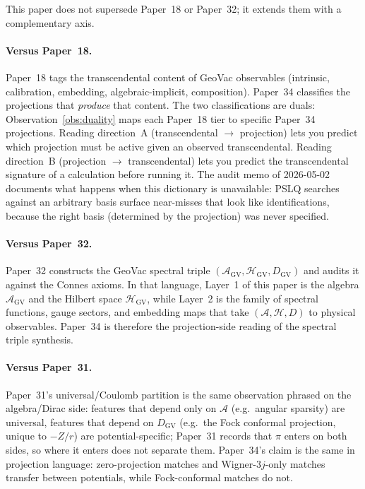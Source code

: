 \documentclass[11pt]{article}
\begin{document}
This paper does not supersede Paper~18 or Paper~32; it extends
them with a complementary axis.

\paragraph{Versus Paper~18.}  Paper~18 tags the transcendental
content of GeoVac observables (intrinsic, calibration, embedding,
algebraic-implicit, composition).  Paper~34 classifies the projections that
\emph{produce} that content.  The two classifications are
duals: Observation~\ref{obs:duality} maps each Paper~18 tier to
specific Paper~34 projections.  Reading direction~A
(transcendental $\to$ projection) lets you predict which projection
must be active given an observed transcendental.  Reading
direction~B (projection $\to$ transcendental) lets you predict the
transcendental signature of a calculation before running it.  The
audit memo of 2026-05-02 documents what happens when this dictionary
is unavailable: PSLQ searches against an arbitrary basis surface
near-misses that look like identifications, because the right basis
(determined by the projection) was never specified.

\paragraph{Versus Paper~32.}  Paper~32 constructs the GeoVac
spectral triple $(\mathcal{A}_{\text{GV}}, \mathcal{H}_{\text{GV}},
D_{\text{GV}})$ and audits it against the Connes axioms.  In that
language, Layer~1 of this paper is the algebra
$\mathcal{A}_{\text{GV}}$ and the Hilbert space
$\mathcal{H}_{\text{GV}}$, while Layer~2 is the family of
spectral functions, gauge sectors, and embedding maps that take
$(\mathcal{A}, \mathcal{H}, D)$ to physical observables.
Paper~34 is therefore the projection-side reading of the spectral
triple synthesis.

\paragraph{Versus Paper~31.}  Paper~31's universal/Coulomb
partition is the same observation phrased on the algebra/Dirac side:
features that depend only on $\mathcal{A}$ (e.g.\ angular sparsity)
are universal, features that depend on $D_{\text{GV}}$ (e.g.\
the Fock conformal projection, unique to $-Z/r$) are
potential-specific; Paper~31 records that $\pi$ enters on both sides,
so where it enters does not separate them.  Paper~34's claim is the
same in projection language: zero-projection matches and
Wigner-$3j$-only matches transfer between potentials, while
Fock-conformal matches do not.
\end{document}

